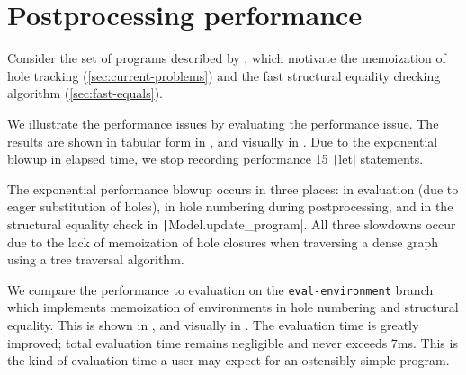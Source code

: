 \section{Postprocessing performance}
\label{sec:evaluation-renumbering}

Consider the set of programs described by , which motivate the memoization of hole tracking (\cref{sec:current-problems}) and the fast structural equality checking algorithm (\cref{sec:fast-equals}).

We illustrate the performance issues by evaluating the performance issue. The results are shown in tabular form in , and visually in . Due to the exponential blowup in elapsed time, we stop recording performance 15 \texttt|let| statements.

The exponential performance blowup occurs in three places: in evaluation (due to eager substitution of holes), in hole numbering during postprocessing, and in the structural equality check in \texttt|Model.update_program|. All three slowdowns occur due to the lack of memoization of hole closures when traversing a dense graph using a tree traversal algorithm.

We compare the performance to evaluation on the \texttt{eval-environment} branch which implements memoization of environments in hole numbering and structural equality. This is shown in , and visually in . The evaluation time is greatly improved; total evaluation time remains negligible and never exceeds 7ms. This is the kind of evaluation time a user may expect for an ostensibly simple program.


